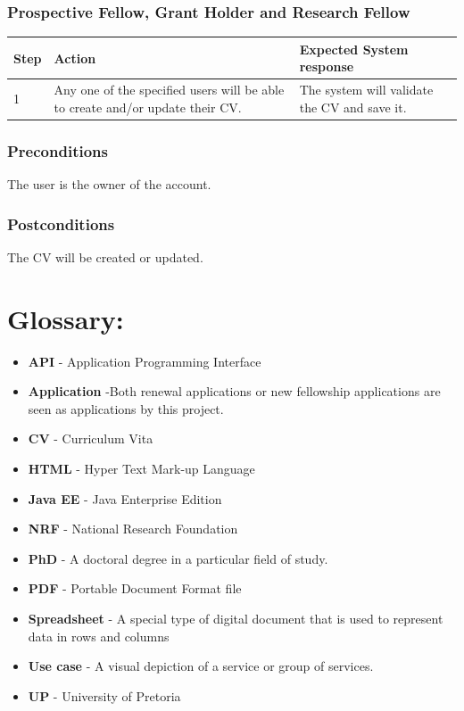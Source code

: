 \documentclass[12pt]{article}
\begin{document}
\subsubsection{Prospective Fellow, Grant Holder and Research Fellow}
\begin{center}
	\begin{tabular}{|l|p{6cm}|p{8cm}|}
	\hline
	Step & Action & Expected System response \\
	\hline
	1 & Any one of the specified users will be able to create and/or update their CV. & The system will validate the CV and save it. \\
	\hline
	
	\end{tabular}
\end{center}

\subsubsection*{Preconditions}
The user is the owner of the account.

\subsubsection*{Postconditions}
The CV will be created or updated.
\newpage
\section{Glossary:}
\vspace{0.2in}

\begin{itemize}

\item \textbf{API} - Application Programming Interface
\item \textbf{Application} -Both renewal applications or new fellowship applications are seen as applications by this project.
\item \textbf{CV} - Curriculum Vita
\item \textbf{HTML} - Hyper Text Mark-up Language
\item \textbf{Java EE} - Java Enterprise Edition
\item \textbf{NRF} - National Research Foundation
\item \textbf{PhD} - A doctoral degree in a particular field of study.
\item \textbf{PDF} - Portable Document Format file
\item \textbf{Spreadsheet} - A special type of digital document that is used to represent data in rows and columns
\item \textbf{Use case} - A visual depiction of a service or group of services.
\item \textbf{UP} - University of Pretoria
 


\end{itemize}	
\end{document}
